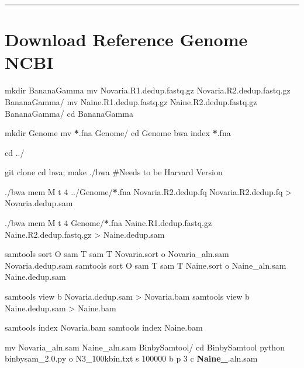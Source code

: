 \documentclass[letterpaper,10pt,english]{sphinxhowto}
\begin{document}
\bigskip\hrule\bigskip



\section{Download Reference Genome NCBI}
\label{\detokenize{CNV:download-reference-genome-ncbi}}
\sphinxAtStartPar
{}

\sphinxAtStartPar
mkdir BananaGamma
mv Novaria.R1.dedup.fastq.gz Novaria.R2.dedup.fastq.gz BananaGamma/
mv Naine.R1.dedup.fastq.gz Naine.R2.dedup.fastq.gz BananaGamma/
cd BananaGamma

\sphinxAtStartPar
mkdir Genome
mv {\color{red}\bfseries{}*}.fna Genome/
cd Genome bwa index {\color{red}\bfseries{}*}.fna

\sphinxAtStartPar
cd ../

\sphinxAtStartPar
{}

\sphinxAtStartPar
git clone 
cd bwa; make
./bwa
\#Needs to be Harvard Version

\sphinxAtStartPar
./bwa mem \sphinxhyphen{}M \sphinxhyphen{}t 4 ../Genome/{\color{red}\bfseries{}*}.fna Novaria.R2.dedup.fq Novaria.R2.dedup.fq \textgreater{} Novaria.dedup.sam

\sphinxAtStartPar
./bwa mem \sphinxhyphen{}M \sphinxhyphen{}t 4 Genome/{\color{red}\bfseries{}*}.fna Naine.R1.dedup.fastq.gz Naine.R2.dedup.fastq.gz \textgreater{} Naine.dedup.sam

\sphinxAtStartPar
samtools sort \sphinxhyphen{}O sam \sphinxhyphen{}T sam \sphinxhyphen{}T Novaria.sort \sphinxhyphen{}o Novaria\_aln.sam Novaria.dedup.sam
samtools sort \sphinxhyphen{}O sam \sphinxhyphen{}T sam \sphinxhyphen{}T Naine.sort \sphinxhyphen{}o Naine\_aln.sam Naine.dedup.sam

\sphinxAtStartPar
samtools view \sphinxhyphen{}b Novaria.dedup.sam \textgreater{} Novaria.bam
samtools view \sphinxhyphen{}b Naine.dedup.sam \textgreater{} Naine.bam

\sphinxAtStartPar
samtools index Novaria.bam
samtools index Naine.bam

\sphinxAtStartPar
mv Novaria\_aln.sam Naine\_aln.sam Bin\sphinxhyphen{}by\sphinxhyphen{}Sam\sphinxhyphen{}tool/
cd Bin\sphinxhyphen{}by\sphinxhyphen{}Sam\sphinxhyphen{}tool
python bin\sphinxhyphen{}by\sphinxhyphen{}sam\_2.0.py \sphinxhyphen{}o N3\_100kbin.txt \sphinxhyphen{}s 100000 \sphinxhyphen{}b \sphinxhyphen{}p 3 \sphinxhyphen{}c {\color{red}\bfseries{}Naine\_}.aln.sam
\end{document}
